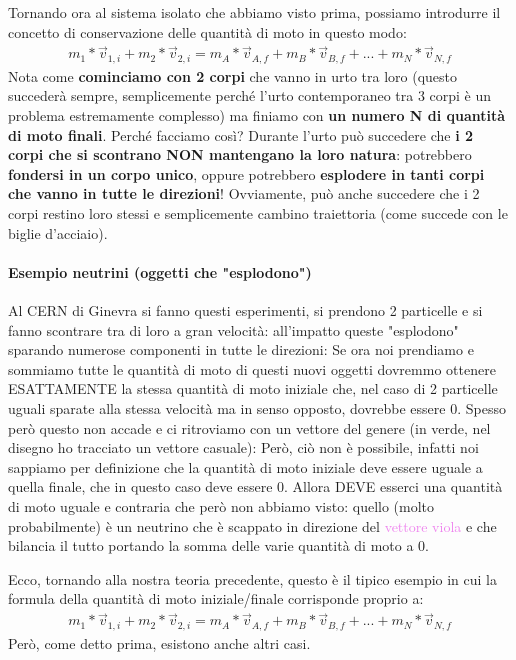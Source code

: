             Tornando ora al sistema isolato che abbiamo visto prima, possiamo introdurre il concetto di conservazione delle quantità di moto in questo modo:
            \begin{align*}
                m_1*\vec{v}_{1, i}+m_2*\vec{v}_{2, i}=m_A*\vec{v}_{A, f}+m_B*\vec{v}_{B, f}+...+m_N*\vec{v}_{N, f}
            \end{align*}
            Nota come \textbf{cominciamo con 2 corpi} che vanno in urto tra loro (questo succederà sempre, semplicemente perché l'urto contemporaneo tra 3 corpi è un problema estremamente complesso) ma finiamo con \textbf{un numero N di quantità di moto finali}. Perché facciamo così? Durante l'urto può succedere che \textbf{i 2 corpi che si scontrano NON mantengano la loro natura}: potrebbero \textbf{fondersi in un corpo unico}, oppure potrebbero \textbf{esplodere in tanti corpi che vanno in tutte le direzioni}! Ovviamente, può anche succedere che i 2 corpi restino loro stessi e semplicemente cambino traiettoria (come succede con le biglie d'acciaio).

            \paragraph{Esempio neutrini (oggetti che "esplodono")}
                Al CERN di Ginevra si fanno questi esperimenti, si prendono 2 particelle e si fanno scontrare tra di loro a gran velocità: all'impatto queste "esplodono" sparando numerose componenti in tutte le direzioni:
                Se ora noi prendiamo e sommiamo tutte le quantità di moto di questi nuovi oggetti dovremmo ottenere ESATTAMENTE la stessa quantità di moto iniziale che, nel caso di 2 particelle uguali sparate alla stessa velocità ma in senso opposto, dovrebbe essere 0. Spesso però questo non accade e ci ritroviamo con un vettore del genere (\textcolor{OliveGreen}{in verde}, nel disegno ho tracciato un vettore casuale):
                Però, ciò non è possibile, infatti noi sappiamo per definizione che la quantità di moto iniziale deve essere uguale a quella finale, che in questo caso deve essere 0. Allora DEVE esserci una quantità di moto uguale e contraria che però non abbiamo visto: quello (molto probabilmente) è un neutrino che è scappato in direzione del \textcolor{Violet}{vettore viola} e che bilancia il tutto portando la somma delle varie quantità di moto a 0.

                Ecco, tornando alla nostra teoria precedente, questo è il tipico esempio in cui la formula della quantità di moto iniziale/finale corrisponde proprio a:
                \begin{align*}
                    m_1*\vec{v}_{1, i}+m_2*\vec{v}_{2, i}=m_A*\vec{v}_{A, f}+m_B*\vec{v}_{B, f}+...+m_N*\vec{v}_{N, f}
                \end{align*}
                Però, come detto prima, esistono anche altri casi.

